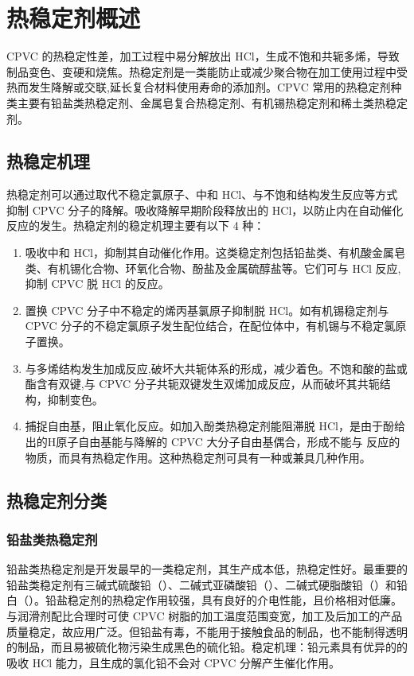 \section{热稳定剂概述}

CPVC 的热稳定性差，加工过程中易分解放出 HCl，生成不饱和共轭多烯，导致制品变色、变硬和烧焦。热稳定剂是一类能防止或减少聚合物在加工使用过程中受热而发生降解或交联,延长复合材料使用寿命的添加剂。CPVC 常用的热稳定剂种类主要有铅盐类热稳定剂、金属皂复合热稳定剂、有机锡热稳定剂和稀土类热稳定剂。

\subsection{热稳定机理}
热稳定剂可以通过取代不稳定氯原子、中和 HCl、与不饱和结构发生反应等方式抑制 CPVC 分子的降解。吸收降解早期阶段释放出的 HCl，以防止内在自动催化反应的发生。热稳定剂的稳定机理主要有以下 4 种：
\begin{enumerate}[(1) ]
    \item 吸收中和 HCl，抑制其自动催化作用。这类稳定剂包括铅盐类、有机酸金属皂类、有机锡化合物、环氧化合物、酚盐及金属硫醇盐等。它们可与 HCl 反应,抑制 CPVC 脱 HCl 的反应。
    \item 置换 CPVC 分子中不稳定的烯丙基氯原子抑制脱 HCl。如有机锡稳定剂与 CPVC 分子的不稳定氯原子发生配位结合，在配位体中，有机锡与不稳定氯原子置换。
    \item 与多烯结构发生加成反应,破坏大共轭体系的形成，减少着色。不饱和酸的盐或酯含有双键,与 CPVC 分子共轭双键发生双烯加成反应，从而破坏其共轭结构，抑制变色。
    \item 捕捉自由基，阻止氧化反应。如加入酚类热稳定剂能阻滞脱 HCl，是由于酚给出的H原子自由基能与降解的 CPVC 大分子自由基偶合，形成不能与  反应的物质，而具有热稳定作用。这种热稳定剂可具有一种或兼具几种作用。
\end{enumerate}

\subsection{热稳定剂分类}

\subsubsection{铅盐类热稳定剂}
铅盐类热稳定剂是开发最早的一类稳定剂，其生产成本低，热稳定性好。最重要的铅盐类稳定剂有三碱式硫酸铅（）、二碱式亚磷酸铅（）、二碱式硬脂酸铅（）和铅白（）。铅盐稳定剂的热稳定作用较强，具有良好的介电性能，且价格相对低廉。与润滑剂配比合理时可使 CPVC 树脂的加工温度范围变宽，加工及后加工的产品质量稳定，故应用广泛。但铅盐有毒，不能用于接触食品的制品，也不能制得透明的制品，而且易被硫化物污染生成黑色的硫化铅。稳定机理：铅元素具有优异的的吸收 HCl 能力，且生成的氯化铅不会对 CPVC 分解产生催化作用。


